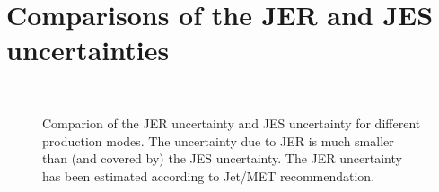 \section{Comparisons of the JER and JES uncertainties}

\begin{figure}[!h!tb]
  \begin{center}

     \\
    \caption{Comparion of the JER uncertainty and JES uncertainty for different production modes. The uncertainty due to JER is much smaller than
    (and covered by) the JES uncertainty. The JER uncertainty has been estimated according to Jet/MET recommendation.
  }
  \label{fig:jesvsjer}
 \end{center}
\end{figure}
